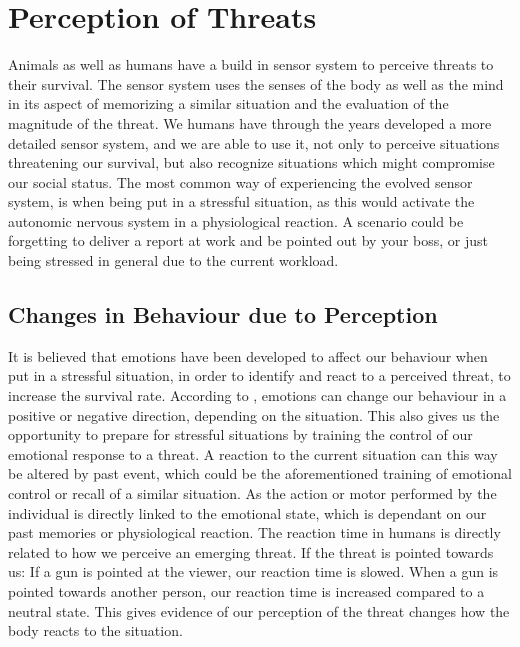 \section{Perception of Threats} \label{perception}
Animals as well as humans have a build in sensor system to perceive threats to their survival. The sensor system uses the senses of the body as well as the mind in its aspect of memorizing a similar situation and the evaluation of the magnitude of the threat. We humans have through the years developed a more detailed sensor system, and we are able to use it, not only to perceive situations threatening our survival, but also recognize situations which might compromise our social status. The most common way of experiencing the evolved sensor system, is when being put in a stressful situation, as this would activate the autonomic nervous system in a physiological reaction. A scenario could be forgetting to deliver a report at work and be pointed out by your boss, or just being stressed in general due to the current workload.


\subsection{Changes in Behaviour due to Perception}
It is believed that emotions have been developed to affect our behaviour when put in a stressful situation, in order to identify and react to a perceived threat, to increase the survival rate. According to \cite{threat_behaviour}, emotions can change our behaviour in a positive or negative direction, depending on the situation. This also gives us the opportunity to prepare for stressful situations by training the control of our emotional response to a threat. A reaction to the current situation can this way be altered by past event, which could be the aforementioned training of emotional control or recall of a similar situation. As the action or motor performed by the individual is directly linked to the emotional state, which is dependant on our past memories or physiological reaction. The reaction time in humans is directly related to how we perceive an emerging threat. If the threat is pointed towards us: If a gun is pointed at the viewer, our reaction time is slowed. When a gun is pointed towards another person, our reaction time is increased compared to a neutral state. This gives evidence of our perception of the threat changes how the body reacts to the situation.
\cite{threat_behaviour}

